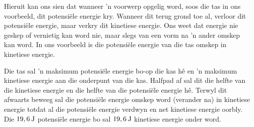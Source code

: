 Hieruit kan ons sien dat wanneer  'n voorwerp opgelig word, soos die tas in ons voorbeeld, dit potensiële energie kry. Wanneer dit terug grond toe al, verloor dit potensiële energie, maar verkry dit kinetiese energie. Ons weet dat energie nie geskep of vernietig kan word nie, maar slegs van een vorm na  'n ander omskep kan word. In ons voorbeeld is die potensiële energie van die tas omskep in kinetiese energie.\par 
Die tas sal  'n maksimum potensiële energie bo-op die kas hê en  'n maksimum kinetiese energie aan die onderpunt van die kas. Halfpad af sal dit die helfte van die kinetiese energie en die helfte van die potensiële energie hê. Terwyl dit afwaarts beweeg sal die potensiële energie omskep word (verander na) in kinetiese energie totdat al die potensiële energie verdwyn en net kinetiese energie oorbly. Die $19,6\phantom{\rule{2pt}{0ex}}\text{J}$ potensiële energie bo sal $19,6\phantom{\rule{2pt}{0ex}}\text{J}$ kinetiese energie onder word.\par 

